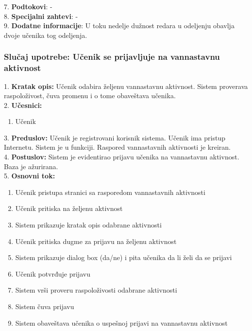 \documentclass{article}
\begin{document}
7. \textbf{Podtokovi}: - \\

8. \textbf{Specijalni zahtevi}: - \\

9. \textbf{Dodatne informacije}:  U toku nedelje dužnost redara u odeljenju obavlja dvoje učenika tog odeljenja. \\


\subsubsection{Slučaj upotrebe: Učenik se prijavljuje na vannastavnu aktivnost} 
1. \textbf{Kratak opis:} Učenik odabira željenu vannastavnu aktivnost. Sistem proverava raspoloživost, čuva promenu i o tome obaveštava učenika. \\

2. \textbf{Učesnici:}
\begin{enumerate} [label=(\alph*)]
\item Učenik
\end{enumerate} 

3. \textbf{Preduslov:} Učenik je registrovani korisnik sistema. Učenik ima pristup Internetu. Sistem je u funkciji. Raspored vannastavnih aktivnosti je kreiran. \\

4. \textbf{Postuslov:} Sistem je evidentirao prijavu učenika na vannastavnu aktivnost. Baza je ažurirana. \\

5. \textbf{Osnovni tok:} 
\begin{enumerate} [label=(\alph*)]
\item Učenik pristupa stranici sa rasporedom vannastavnih aktivnosti
\item Učenik pritiska na željenu aktivnost
\item Sistem prikazuje kratak opis odabrane aktivnosti
\item Učenik pritiska dugme za prijavu na željenu aktivnost
\item Sistem prikazuje dialog box (da/ne) i pita učenika da li želi da se prijavi
\item Učenik potvrđuje prijavu
\item Sistem vrši proveru raspoloživosti odabrane aktivnosti
\item Sistem čuva prijavu
\item Sistem obaveštava učenika o uspešnoj prijavi na vannastavnu aktivnost
\end{enumerate}
\end{document}
